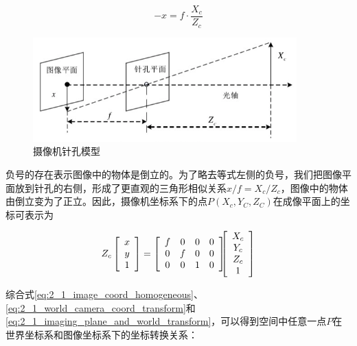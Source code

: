 \begin{equation}\label{eq:2_1_triangular_similarity}
-x = f \cdot \frac{X_c}{Z_c}
\end{equation}

\begin{figure}[!htb] %
	\centering
	\includegraphics[width=4in]{figures/2_1_pinhole_model}
	\caption{摄像机针孔模型}\label{fig:2_1_pinhole_model}
\end{figure}

负号的存在表示图像中的物体是倒立的。为了略去等式左侧的负号，我们把图像平面放到针孔的右侧，形成了更直观的三角形相似关系$x/f = X_c/Z_c$，图像中的物体由倒立变为了正立。因此，摄像机坐标系下的点$P(X_c, Y_C, Z_C)$在成像平面上的坐标可表示为

\begin{eqnarray}\label{eq:2_1_imaging_plane_and_world_transform}
Z_c
\left[\begin{array}{c} x \\ y \\ 1 \end{array} \right]
=
\left[\begin{array}{cccc}
f & 0 & 0 & 0 \\
0 & f & 0 & 0 \\
0 & 0 & 1 & 0
\end{array}
\right]
\hspace{-6pt} %
\left[\begin{array}{c} X_c \\ Y_c \\ Z_c \\ 1 \end{array}\right]
\end{eqnarray}

综合式\ref{eq:2_1_image_coord_homogeneous}、\ref{eq:2_1_world_camera_coord_transform}和\ref{eq:2_1_imaging_plane_and_world_transform}，可以得到空间中任意一点$P$在世界坐标系和图像坐标系下的坐标转换关系：

